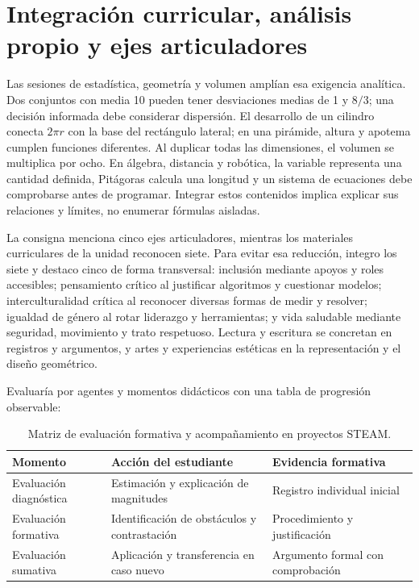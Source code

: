 \documentclass[spanish,letterpaper,oneside]{article}
\begin{document}
\section{Integración curricular, análisis propio y ejes articuladores}
Las sesiones de estadística, geometría y volumen amplían esa exigencia analítica. Dos conjuntos con media 10 pueden tener desviaciones medias de 1 y $8/3$; una decisión informada debe considerar dispersión. El desarrollo de un cilindro conecta $2\pi r$ con la base del rectángulo lateral; en una pirámide, altura y apotema cumplen funciones diferentes. Al duplicar todas las dimensiones, el volumen se multiplica por ocho. En álgebra, distancia y robótica, la variable representa una cantidad definida, Pitágoras calcula una longitud y un sistema de ecuaciones debe comprobarse antes de programar. Integrar estos contenidos implica explicar sus relaciones y límites, no enumerar fórmulas aisladas.

La consigna menciona cinco ejes articuladores, mientras los materiales curriculares de la unidad reconocen siete. Para evitar esa reducción, integro los siete y destaco cinco de forma transversal: inclusión mediante apoyos y roles accesibles; pensamiento crítico al justificar algoritmos y cuestionar modelos; interculturalidad crítica al reconocer diversas formas de medir y resolver; igualdad de género al rotar liderazgo y herramientas; y vida saludable mediante seguridad, movimiento y trato respetuoso. Lectura y escritura se concretan en registros y argumentos, y artes y experiencias estéticas en la representación y el diseño geométrico.

Evaluaría por agentes y momentos didácticos con una tabla de progresión observable:

\begin{table}[h!]
\centering
\small
\begin{tabular}{|p{3.5cm}|p{5.5cm}|p{5cm}|}
\hline
\rowcolor{iiiepePale} \textbf{Momento} & \textbf{Acción del estudiante} & \textbf{Evidencia formativa} \\ \hline
Evaluación diagnóstica & Estimación y explicación de magnitudes & Registro individual inicial \\ \hline
Evaluación formativa & Identificación de obstáculos y contrastación & Procedimiento y justificación \\ \hline
Evaluación sumativa & Aplicación y transferencia en caso nuevo & Argumento formal con comprobación \\ \hline
\end{tabular}
\caption{Matriz de evaluación formativa y acompañamiento en proyectos STEAM.}
\end{table}
\end{document}
